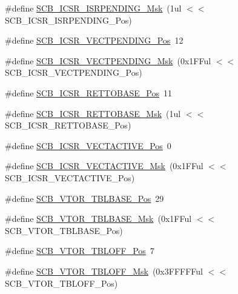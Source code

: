 \begin{DoxyCompactItemize}
\item 
\#define \hyperlink{group___c_m_s_i_s___c_m3___s_c_b_ga056d74fd538e5d36d3be1f28d399c877}{S\-C\-B\-\_\-\-I\-C\-S\-R\-\_\-\-I\-S\-R\-P\-E\-N\-D\-I\-N\-G\-\_\-\-Msk}~(1ul $<$$<$ S\-C\-B\-\_\-\-I\-C\-S\-R\-\_\-\-I\-S\-R\-P\-E\-N\-D\-I\-N\-G\-\_\-\-Pos)
\item 
\#define \hyperlink{group___c_m_s_i_s___c_m3___s_c_b_gada60c92bf88d6fd21a8f49efa4a127b8}{S\-C\-B\-\_\-\-I\-C\-S\-R\-\_\-\-V\-E\-C\-T\-P\-E\-N\-D\-I\-N\-G\-\_\-\-Pos}~12
\item 
\#define \hyperlink{group___c_m_s_i_s___c_m3___s_c_b_gacb6992e7c7ddc27a370f62878a21ef72}{S\-C\-B\-\_\-\-I\-C\-S\-R\-\_\-\-V\-E\-C\-T\-P\-E\-N\-D\-I\-N\-G\-\_\-\-Msk}~(0x1\-F\-Ful $<$$<$ S\-C\-B\-\_\-\-I\-C\-S\-R\-\_\-\-V\-E\-C\-T\-P\-E\-N\-D\-I\-N\-G\-\_\-\-Pos)
\item 
\#define \hyperlink{group___c_m_s_i_s___c_m3___s_c_b_ga403d154200242629e6d2764bfc12a7ec}{S\-C\-B\-\_\-\-I\-C\-S\-R\-\_\-\-R\-E\-T\-T\-O\-B\-A\-S\-E\-\_\-\-Pos}~11
\item 
\#define \hyperlink{group___c_m_s_i_s___c_m3___s_c_b_gaca6fc3f79bb550f64fd7df782ed4a5f6}{S\-C\-B\-\_\-\-I\-C\-S\-R\-\_\-\-R\-E\-T\-T\-O\-B\-A\-S\-E\-\_\-\-Msk}~(1ul $<$$<$ S\-C\-B\-\_\-\-I\-C\-S\-R\-\_\-\-R\-E\-T\-T\-O\-B\-A\-S\-E\-\_\-\-Pos)
\item 
\#define \hyperlink{group___c_m_s_i_s___c_m3___s_c_b_gae4f602c7c5c895d5fb687b71b0979fc3}{S\-C\-B\-\_\-\-I\-C\-S\-R\-\_\-\-V\-E\-C\-T\-A\-C\-T\-I\-V\-E\-\_\-\-Pos}~0
\item 
\#define \hyperlink{group___c_m_s_i_s___c_m3___s_c_b_ga5533791a4ecf1b9301c883047b3e8396}{S\-C\-B\-\_\-\-I\-C\-S\-R\-\_\-\-V\-E\-C\-T\-A\-C\-T\-I\-V\-E\-\_\-\-Msk}~(0x1\-F\-Ful $<$$<$ S\-C\-B\-\_\-\-I\-C\-S\-R\-\_\-\-V\-E\-C\-T\-A\-C\-T\-I\-V\-E\-\_\-\-Pos)
\item 
\#define \hyperlink{group___c_m_s_i_s___c_m3___s_c_b_gad9720a44320c053883d03b883b955751}{S\-C\-B\-\_\-\-V\-T\-O\-R\-\_\-\-T\-B\-L\-B\-A\-S\-E\-\_\-\-Pos}~29
\item 
\#define \hyperlink{group___c_m_s_i_s___c_m3___s_c_b_ga778dd0ba178466b2a8877a6b8aa345ee}{S\-C\-B\-\_\-\-V\-T\-O\-R\-\_\-\-T\-B\-L\-B\-A\-S\-E\-\_\-\-Msk}~(0x1\-F\-Ful $<$$<$ S\-C\-B\-\_\-\-V\-T\-O\-R\-\_\-\-T\-B\-L\-B\-A\-S\-E\-\_\-\-Pos)
\item 
\#define \hyperlink{group___c_m_s_i_s___c_m3___s_c_b_gac6a55451ddd38bffcff5a211d29cea78}{S\-C\-B\-\_\-\-V\-T\-O\-R\-\_\-\-T\-B\-L\-O\-F\-F\-\_\-\-Pos}~7
\item 
\#define \hyperlink{group___c_m_s_i_s___c_m3___s_c_b_ga75e395ed74042923e8c93edf50f0996c}{S\-C\-B\-\_\-\-V\-T\-O\-R\-\_\-\-T\-B\-L\-O\-F\-F\-\_\-\-Msk}~(0x3\-F\-F\-F\-F\-Ful $<$$<$ S\-C\-B\-\_\-\-V\-T\-O\-R\-\_\-\-T\-B\-L\-O\-F\-F\-\_\-\-Pos)

\end{DoxyCompactItemize}
